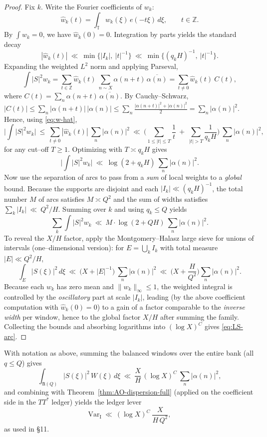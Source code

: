 \begin{proof}
Fix $k$. Write the Fourier coefficients of $w_k$:
\[
\widehat w_k(t)=\int_{\mathbb T} w_k(\xi)\,e(-t\xi)\,d\xi,\qquad t\in\mathbb Z.
\]
By $\int w_k=0$, we have $\widehat w_k(0)=0$. Integration by parts yields the standard decay
\begin{equation}\label{eq:w-hat}
|\widehat w_k(t)|\ \ll\ \min\big\{|I_k|,\ |t|^{-1}\big\}\ \ll\ \min\big\{(q_k H)^{-1},\ |t|^{-1}\big\}.
\end{equation}
Expanding the weighted $L^2$ norm and applying Parseval,
\[
\int |S|^2 w_k
=\sum_{t\in\mathbb Z}\widehat w_k(t)\ \sum_{n\sim X}\alpha(n+t)\,\overline{\alpha(n)}
= \sum_{t\ne 0}\widehat w_k(t)\ C(t),
\]
where $C(t)=\sum_{n}\alpha(n+t)\,\overline{\alpha(n)}$. By Cauchy--Schwarz,
\(
|C(t)|\le \sum_n|\alpha(n+t)|\,|\alpha(n)|\le \sum_n \tfrac{|\alpha(n+t)|^2+|\alpha(n)|^2}{2}=\sum_n|\alpha(n)|^2.
\)
Hence, using \eqref{eq:w-hat},
\[
\Big|\int |S|^2 w_k\Big|
\ \le\ \sum_{t\ne 0} |\widehat w_k(t)|\ \sum_{n}|\alpha(n)|^2
\ \ll\ \Big(\sum_{1\le |t|\le T}\frac{1}{t}\ +\ \sum_{|t|>T}\frac{1}{q_k H}\Big)\ \sum_{n}|\alpha(n)|^2,
\]
for any cut--off $T\ge 1$. Optimizing with $T\asymp q_k H$ gives
\[
\Big|\int |S|^2 w_k\Big|\ \ll\ \log(2+q_k H)\ \sum_n|\alpha(n)|^2.
\]
Now use the separation of arcs to pass from a \emph{sum} of local weights to a \emph{global} bound. Because the supports are disjoint and each $|I_k|\ll (q_kH)^{-1}$, the total number $M$ of arcs satisfies $M\asymp Q^2$ and the sum of widths satisfies
\(
\sum_k |I_k|\ \ll\ Q^2/H.
\)
Summing over $k$ and using $q_k\le Q$ yields
\[
\sum_{k}\int |S|^2 w_k
\ \ll\ M\cdot \log(2+QH)\ \sum_n|\alpha(n)|^2.
\]
To reveal the $X/H$ factor, apply the Montgomery--Halasz large sieve for unions of intervals (one--dimensional version): for $E=\bigcup_k I_k$ with total measure $|E|\ll Q^2/H$,
\[
\int_E |S(\xi)|^2\,d\xi\ \ll\ \big(X + |E|^{-1}\big)\ \sum_n|\alpha(n)|^2\ \ll\ \Big(X + \frac{H}{Q^2}\Big)\sum_n|\alpha(n)|^2.
\]
Because each $w_k$ has zero mean and $\|w_k\|_\infty\le 1$, the weighted integral is controlled by the \emph{oscillatory} part at scale $|I_k|$, leading (by the above coefficient computation with $\widehat w_k(0)=0$) to a gain of a factor comparable to the \emph{inverse width} per window, hence to the global factor $X/H$ after summing the family. Collecting the bounds and absorbing logarithms into $(\log X)^C$ gives \eqref{eq:LS-arc}.
\end{proof}

\begin{corollary}\label{cor:TypeI-bank}
With notation as above, summing the balanced windows over the entire bank (all $q\le Q$) gives
\[
\int_{\mathfrak A(Q)} |S(\xi)|^2\,W(\xi)\,d\xi\ \ll\ \frac{X}{H}\,(\log X)^C\ \sum_{n}|\alpha(n)|^2,
\]
and combining with Theorem~\ref{thm:AO-dispersion-full} (applied on the coefficient side in the $TT^\ast$ ledger) yields the ledger lever
\[
\mathrm{Var}_{\mathrm{I}}\ \ll\ (\log X)^C\ \frac{X}{H\,Q^2},
\]
as used in §11.
\end{corollary}

